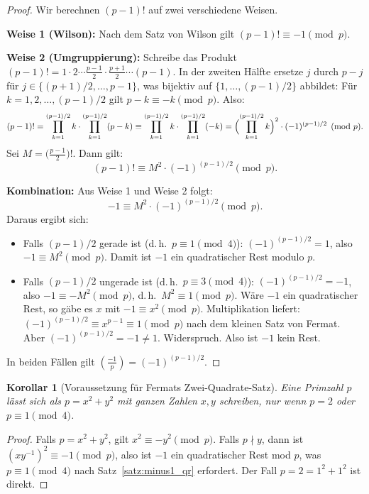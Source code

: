 \documentclass[12pt,a4paper]{amsart}
\newtheorem{korollar}[theorem]{Korollar}
\theoremstyle{definition}
\newcommand{\leg}[2]{\left(\frac{#1}{#2}\right)}
\begin{document}
\begin{proof}
  Wir berechnen $(p-1)!$ auf zwei verschiedene Weisen.

  \textbf{Weise 1 (Wilson):}
  Nach dem Satz von Wilson gilt $(p-1)! \equiv -1 \pmod{p}$.

  \textbf{Weise 2 (Umgruppierung):}
  Schreibe das Produkt $(p-1)! = 1 \cdot 2 \cdots \frac{p-1}{2} \cdot
  \frac{p+1}{2} \cdots (p-1)$. In der zweiten Hälfte ersetze $j$ durch
  $p - j$ für $j \in \{(p+1)/2, \ldots, p-1\}$, was bijektiv auf
  $\{1, \ldots, (p-1)/2\}$ abbildet:
  Für $k = 1, 2, \ldots, (p-1)/2$ gilt $p - k \equiv -k \pmod{p}$.
  Also:
  \[
    (p-1)! = \prod_{k=1}^{(p-1)/2} k \cdot \prod_{k=1}^{(p-1)/2}(p-k)
    \equiv \prod_{k=1}^{(p-1)/2} k \cdot \prod_{k=1}^{(p-1)/2}(-k)
    = \Bigl(\prod_{k=1}^{(p-1)/2} k\Bigr)^2 \cdot (-1)^{(p-1)/2} \pmod{p}.
  \]
  Sei $M = \bigl(\tfrac{p-1}{2}\bigr)!$. Dann gilt:
  \[
    (p-1)! \equiv M^2 \cdot (-1)^{(p-1)/2} \pmod{p}.
  \]

  \textbf{Kombination:}
  Aus Weise 1 und Weise 2 folgt:
  \[
    -1 \equiv M^2 \cdot (-1)^{(p-1)/2} \pmod{p}.
  \]
  Daraus ergibt sich:
  \begin{itemize}
    \item Falls $(p-1)/2$ gerade ist (d.\,h.\ $p \equiv 1 \pmod{4}$):
      $(-1)^{(p-1)/2} = 1$, also $-1 \equiv M^2 \pmod{p}$.
      Damit ist $-1$ ein quadratischer Rest modulo $p$. \checkmark
    \item Falls $(p-1)/2$ ungerade ist (d.\,h.\ $p \equiv 3 \pmod{4}$):
      $(-1)^{(p-1)/2} = -1$, also $-1 \equiv -M^2 \pmod{p}$,
      d.\,h.\ $M^2 \equiv 1 \pmod{p}$.
      Wäre $-1$ ein quadratischer Rest, so gäbe es $x$ mit $-1 \equiv x^2 \pmod{p}$.
      Multiplikation liefert: $(-1)^{(p-1)/2} \equiv x^{p-1} \equiv 1 \pmod{p}$
      nach dem kleinen Satz von Fermat. Aber $(-1)^{(p-1)/2} = -1 \neq 1$.
      Widerspruch. Also ist $-1$ kein Rest. \checkmark
  \end{itemize}
  In beiden Fällen gilt $\leg{-1}{p} = (-1)^{(p-1)/2}$. \qedhere
\end{proof}

\begin{korollar}[Voraussetzung für Fermats Zwei-Quadrate-Satz]%
  \label{kor:zwei_quadrate}
  Eine Primzahl $p$ lässt sich als $p = x^2 + y^2$ mit ganzen Zahlen $x, y$
  schreiben, nur wenn $p = 2$ oder $p \equiv 1 \pmod{4}$.
\end{korollar}

\begin{proof}
  Falls $p = x^2 + y^2$, gilt $x^2 \equiv -y^2 \pmod{p}$. Falls $p \nmid y$,
  dann ist $(xy^{-1})^2 \equiv -1 \pmod{p}$, also ist $-1$ ein quadratischer
  Rest mod $p$, was $p \equiv 1 \pmod{4}$ nach Satz~\ref{satz:minus1_qr}
  erfordert. Der Fall $p = 2 = 1^2 + 1^2$ ist direkt. \qedhere
\end{proof}
\end{document}

